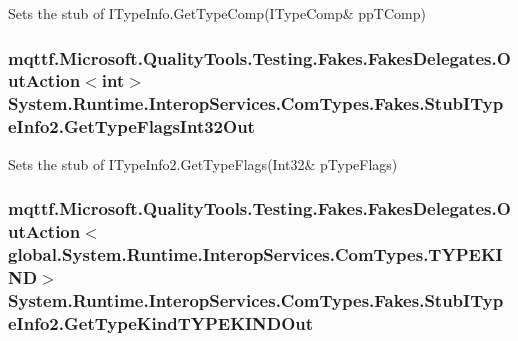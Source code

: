 Sets the stub of I\-Type\-Info.\-Get\-Type\-Comp(I\-Type\-Comp\& pp\-T\-Comp)

\hypertarget{class_system_1_1_runtime_1_1_interop_services_1_1_com_types_1_1_fakes_1_1_stub_i_type_info2_ac2f6fe3a6957288b95e38b7170801c12}{
\subsubsection[{Get\-Type\-Flags\-Int32\-Out}]{\setlength{\rightskip}{0pt plus 5cm}mqttf.\-Microsoft.\-Quality\-Tools.\-Testing.\-Fakes.\-Fakes\-Delegates.\-Out\-Action$<$int$>$ System.\-Runtime.\-Interop\-Services.\-Com\-Types.\-Fakes.\-Stub\-I\-Type\-Info2.\-Get\-Type\-Flags\-Int32\-Out}}\label{class_system_1_1_runtime_1_1_interop_services_1_1_com_types_1_1_fakes_1_1_stub_i_type_info2_ac2f6fe3a6957288b95e38b7170801c12}


Sets the stub of I\-Type\-Info2.\-Get\-Type\-Flags(Int32\& p\-Type\-Flags)

\hypertarget{class_system_1_1_runtime_1_1_interop_services_1_1_com_types_1_1_fakes_1_1_stub_i_type_info2_a641901054dca19f4d4f7ed13ba677e28}{
\subsubsection[{Get\-Type\-Kind\-T\-Y\-P\-E\-K\-I\-N\-D\-Out}]{\setlength{\rightskip}{0pt plus 5cm}mqttf.\-Microsoft.\-Quality\-Tools.\-Testing.\-Fakes.\-Fakes\-Delegates.\-Out\-Action$<$global.\-System.\-Runtime.\-Interop\-Services.\-Com\-Types.\-T\-Y\-P\-E\-K\-I\-N\-D$>$ System.\-Runtime.\-Interop\-Services.\-Com\-Types.\-Fakes.\-Stub\-I\-Type\-Info2.\-Get\-Type\-Kind\-T\-Y\-P\-E\-K\-I\-N\-D\-Out}}\label{class_system_1_1_runtime_1_1_interop_services_1_1_com_types_1_1_fakes_1_1_stub_i_type_info2_a641901054dca19f4d4f7ed13ba677e28}


